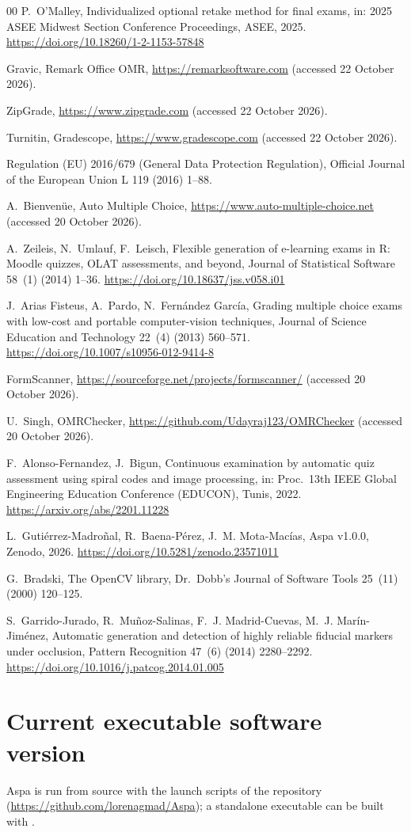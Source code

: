 \documentclass[preprint,12pt, a4paper]{elsarticle}
\begin{document}
\begin{thebibliography}{00}
 P.~O'Malley, Individualized optional retake method for final exams, in: 2025 ASEE Midwest Section Conference Proceedings, ASEE, 2025. \url{https://doi.org/10.18260/1-2-1153-57848}

 Gravic, Remark Office OMR, \url{https://remarksoftware.com} (accessed 22 October 2026).

 ZipGrade, \url{https://www.zipgrade.com} (accessed 22 October 2026).

 Turnitin, Gradescope, \url{https://www.gradescope.com} (accessed 22 October 2026).

 Regulation (EU) 2016/679 (General Data Protection Regulation), Official Journal of the European Union L 119 (2016) 1--88.

 A.~Bienvenüe, Auto Multiple Choice, \url{https://www.auto-multiple-choice.net} (accessed 20 October 2026).

 A.~Zeileis, N.~Umlauf, F.~Leisch, Flexible generation of e-learning exams in R: Moodle quizzes, OLAT assessments, and beyond, Journal of Statistical Software 58~(1) (2014) 1--36. \url{https://doi.org/10.18637/jss.v058.i01}

 J.~Arias Fisteus, A.~Pardo, N.~Fernández García, Grading multiple choice exams with low-cost and portable computer-vision techniques, Journal of Science Education and Technology 22~(4) (2013) 560--571. \url{https://doi.org/10.1007/s10956-012-9414-8}

 FormScanner, \url{https://sourceforge.net/projects/formscanner/} (accessed 20 October 2026).

 U.~Singh, OMRChecker, \url{https://github.com/Udayraj123/OMRChecker} (accessed 20 October 2026).

 F.~Alonso-Fernandez, J.~Bigun, Continuous examination by automatic quiz assessment using spiral codes and image processing, in: Proc.\ 13th IEEE Global Engineering Education Conference (EDUCON), Tunis, 2022. \url{https://arxiv.org/abs/2201.11228}

 L.~Gutiérrez-Madroñal, R.~Baena-Pérez, J.~M. Mota-Macías, Aspa v1.0.0, Zenodo, 2026. \url{https://doi.org/10.5281/zenodo.23571011}

 G.~Bradski, The OpenCV library, Dr.\ Dobb's Journal of Software Tools 25~(11) (2000) 120--125.

 S.~Garrido-Jurado, R.~Muñoz-Salinas, F.~J. Madrid-Cuevas, M.~J. Marín-Jiménez, Automatic generation and detection of highly reliable fiducial markers under occlusion, Pattern Recognition 47~(6) (2014) 2280--2292. \url{https://doi.org/10.1016/j.patcog.2014.01.005}

\end{thebibliography}

\section*{Current executable software version}
\label{sec:execversion}

Aspa is run from source with the launch scripts of the repository (\url{https://github.com/lorenagmad/Aspa}); a standalone executable can be built with .
\end{document}

